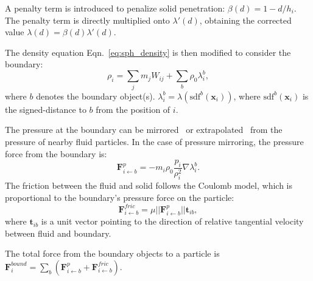 \documentclass[VANCOUVER,STIX1COL]{WileyNJD-v2}
\begin{document}
A penalty term is introduced to penalize solid penetration: $\beta(d) = 1 - d / h_i$. The penalty term is directly multiplied onto $\lambda'(d)$, obtaining the corrected value $\lambda(d) = \beta(d) \lambda'(d)$.


The density equation Eqn.~\ref{eq:sph_density} is then modified to consider the boundary:
\begin{equation}
    \rho_i = \sum_j m_j W_{ij} + \sum_b \rho_0 \lambda_i^b,
\end{equation}
where $b$ denotes the boundary object(s). $\lambda_i^b = \lambda(\mathrm{sdf}^b(\mathbf{x}_i))$, where $\mathrm{sdf}^b(\mathbf{x}_i)$ is the signed-distance to $b$ from the position of $i$.

The pressure at the boundary can be mirrored~\cite{Akinci12} or extrapolated~\cite{Band18b} from the pressure of nearby fluid particles. In the case of pressure mirroring, the pressure force from the boundary is:
\begin{equation}
    \mathbf{F}_{i \leftarrow b}^p = -m_i \rho_0 \frac{p_i}{\rho_i^2} \nabla\lambda_i^b.
    \label{eq:bound_p}
\end{equation}
The friction between the fluid and solid follows the Coulomb model, which is proportional to the boundary's pressure force on the particle:
\begin{equation}
    \mathbf{F}_{i\leftarrow b}^{fric} = \mu ||\mathbf{F}_{i\leftarrow b}^p|| \mathbf{t}_{ib},
    \label{eq:bound_fric}
\end{equation}
where $\mathbf{t}_{ib}$ is a unit vector pointing to the direction of relative tangential velocity between fluid and boundary.

The total force from the boundary objects to a particle is $\mathbf{F}_i^{bound} = \sum_b (\mathbf{F}_{i \leftarrow b}^p + \mathbf{F}_{i\leftarrow b}^{fric})$.

\vspace{-0.5\baselineskip}
\end{document}
